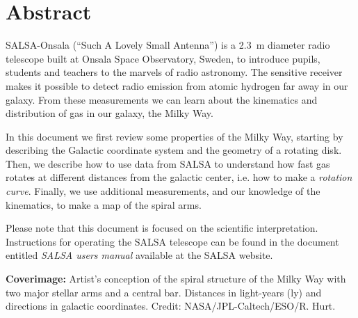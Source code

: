 \chapter*{Abstract}
SALSA-Onsala (``Such A Lovely Small Antenna'') is a 2.3~m diameter radio
telescope built at Onsala Space Observatory, Sweden, to introduce pupils,
students and teachers to the marvels of radio astronomy.  The sensitive
receiver makes it possible to detect radio emission from atomic hydrogen far
away in our galaxy. From these measurements we can learn about the kinematics
and distribution of gas in our galaxy, the Milky Way. 

In this document we first review some properties of the Milky Way, starting by
describing the Galactic coordinate system and the geometry of a rotating disk.
Then, we describe how to use data from SALSA to understand how fast gas rotates
at different distances from the galactic center, i.e. how to make a
\emph{rotation curve}. Finally, we use additional measurements, and our
knowledge of the kinematics, to make a map of the spiral arms.

Please note that this document is focused on the scientific interpretation. 
Instructions for operating the SALSA telescope can be found in the document
entitled \emph{SALSA users manual} available at the SALSA website.


\vspace{9cm}




{\bf Coverimage:} Artist's conception of the spiral structure of the
Milky Way with two major stellar arms and a central bar. Distances in
light-years (ly) and directions in galactic coordinates. Credit:
NASA/JPL-Caltech/ESO/R. Hurt.
